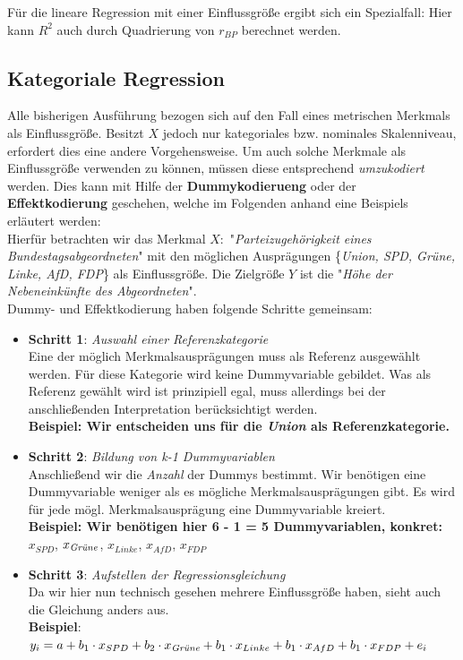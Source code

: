 \documentclass[a4paper]{article}
\newcommand\dangersign[1][2ex]{%
  \renewcommand\stacktype{L}%
  \scaleto{\stackon[1.3pt]{\color{red}$\triangle$}{\tiny !}}{#1}%
}
\begin{document}
\noindent \dangersign[3ex] Für die lineare Regression mit einer Einflussgröße ergibt sich ein Spezialfall: Hier kann $R^2$ auch durch Quadrierung von $r_{BP}$ berechnet werden.

\subsection{Kategoriale Regression} \label{sec:kat-reg}
Alle bisherigen Ausführung bezogen sich auf den Fall eines metrischen Merkmals als Einflussgröße. Besitzt $X$ jedoch nur kategoriales bzw. nominales Skalenniveau, erfordert dies eine andere Vorgehensweise. Um auch solche Merkmale als Einflussgröße verwenden zu können, müssen diese entsprechend \textit{umzukodiert} werden. Dies kann mit Hilfe der \textbf{Dummykodierueng} oder der \textbf{Effektkodierung} geschehen, welche im Folgenden anhand eine Beispiels erläutert werden:\\

\noindent Hierfür betrachten wir das Merkmal $X:$ "\textit{Parteizugehörigkeit eines Bundestagsabgeordneten}" mit den möglichen Ausprägungen \{\textit{Union, SPD, Grüne, Linke, AfD, FDP}\} als Einflussgröße. Die Zielgröße $Y$ ist die "\textit{Höhe der Nebeneinkünfte des Abgeordneten}".\\

\noindent Dummy- und Effektkodierung haben folgende Schritte gemeinsam:
\begin{itemize}
    \item[] \textbf{Schritt 1}: \textit{Auswahl einer Referenzkategorie}\\
            Eine der möglich Merkmalsausprägungen muss als Referenz ausgewählt werden. Für diese Kategorie wird keine Dummyvariable gebildet. Was als Referenz gewählt wird ist prinzipiell egal, muss allerdings bei der anschließenden Interpretation berücksichtigt werden.\\
            \textbf{Beispiel: Wir entscheiden uns für die \textit{Union} als Referenzkategorie.}
    \item[] \textbf{Schritt 2}: \textit{Bildung von k-1 Dummyvariablen}\\
            Anschließend wir die \textit{Anzahl} der Dummys bestimmt. Wir benötigen eine Dummyvariable weniger als es mögliche Merkmalsausprägungen gibt. Es wird für jede mögl. Merkmalsausprägung eine Dummyvariable kreiert.\\
            \textbf{Beispiel: Wir benötigen hier 6 - 1 = 5 Dummyvariablen, konkret:}\\$x_{SPD}$,\; $x_{\mbox{\it \scriptsize Grüne}}$,\; $x_{Linke}$,\; $x_{AfD}$,\; $x_{FDP}$
    \item[] \textbf{Schritt 3}: \textit{Aufstellen der Regressionsgleichung}\\
            Da wir hier nun technisch gesehen mehrere Einflussgröße haben, sieht auch die Gleichung anders aus.\\
            \textbf{Beispiel}: $y_i = a + b_1 \cdot x_{SPD} + b_2 \cdot x_{\mbox{\it \scriptsize Grüne}} + b_1 \cdot x_{Linke} + b_1 \cdot x_{AfD} + b_1 \cdot x_{FDP} + e_i$
\end{itemize}
\end{document}
